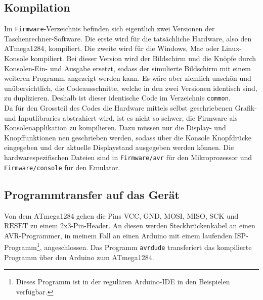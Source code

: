 \documentclass[12pt, a4paper]{report}
\begin{document}
\subsection{Kompilation}
Im \texttt{Firmware}-Verzeichnis befinden sich eigentlich zwei Versionen der Taschenrechner-Software. Die erste wird für die tatsächliche Hardware, also den ATmega1284, kompiliert. Die zweite wird für die Windows, Mac oder Linux-Konsole kompiliert. Bei dieser Version wird der Bildschirm und die Knöpfe durch Konsolen-Ein- und Ausgabe ersetzt, sodass der simulierte Bildschirm mit einem weiteren Programm angezeigt werden kann. Es wäre aber ziemlich unschön und unübersichtlich, die Codeausschnitte, welche in den zwei Versionen identisch sind, zu duplizieren. Deshalb ist dieser identische Code im Verzeichnis \texttt{common}.
\\[\medskipamount]
Da für den Grossteil des Codes die Hardware mittels selbst geschriebenen Grafik- und Inputlibraries abstrahiert wird, ist es nicht so schwer, die Firmware als Konsolenapplikation zu kompilieren. Dazu müssen nur die Display- und Knopffunktionen neu geschrieben werden, sodass über die Konsole Knopfdrücke eingegeben und der aktuelle Displaystand ausgegeben werden können. Die hardwarespezifischen Dateien sind in \texttt{Firmware/avr} für den Mikroprozessor und \texttt{Firmware/console} für den Emulator.
\subsection{Programmtransfer auf das Gerät}
Von dem ATmega1284 gehen die Pins VCC, GND, MOSI, MISO, SCK und $\overline{\textrm{RESET}}$ zu einem 2x3-Pin-Header. An diesen werden Steckbrückenkabel an einen AVR-Programmer, in meinem Fall an einen Arduino mit einem laufenden ISP-Programm\footnote{Dieses Programm ist in der regulären Arduino-IDE in den Beispielen verfügbar.}, angeschlossen. Das Programm \texttt{avrdude} transferiert das kompilierte Programm über den Arduino zum ATmega1284.
\end{document}
